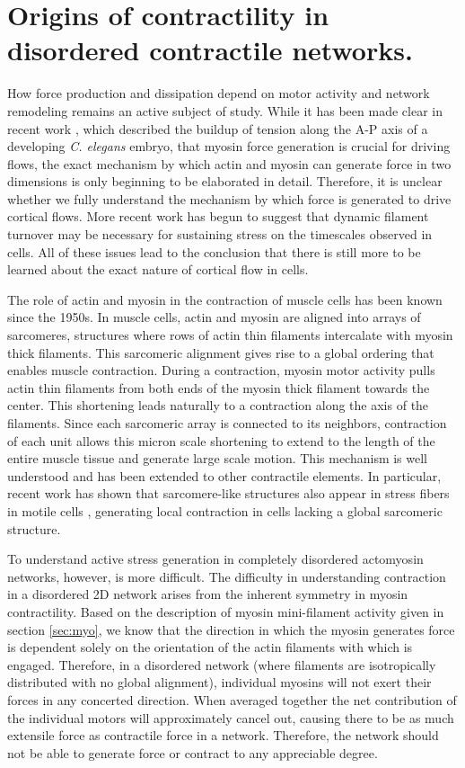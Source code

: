 \section{Origins of contractility in disordered contractile networks.}

How force production and dissipation depend on motor activity and network remodeling remains an active subject of study.  While it has been made clear in recent work \cite{cellmech_flows}, which described the buildup of tension along the A-P axis of a developing \textit{C. elegans} embryo, that myosin force generation is crucial for driving flows, the exact mechanism by which actin and myosin can generate force in two dimensions is only beginning to be elaborated in detail\cite{PhysRevX.4.041002}.  Therefore, it is unclear whether we fully understand the mechanism by which force is generated to drive cortical flows.  More recent work \cite{Mak:2016aa} has begun to suggest that dynamic filament turnover may be necessary for sustaining stress on the timescales observed in cells.  All of these issues lead to the conclusion that there is still more to be learned about the exact nature of cortical flow in cells.

The role of actin and myosin in the contraction of muscle cells has been known since the 1950s\cite{HUXLEY1954,}.  In muscle cells, actin and myosin are aligned into arrays of sarcomeres, structures where rows of actin thin filaments intercalate with myosin thick filaments\cite{Iwazumi1989}.  This sarcomeric alignment gives rise to a global ordering that enables muscle contraction. During a contraction, myosin motor activity pulls actin thin filaments from both ends of the myosin thick filament towards the center. This shortening leads naturally to a contraction along the axis of the filaments. Since each sarcomeric array is connected to its neighbors, contraction of each unit  allows this micron scale shortening to extend to the length of the entire muscle tissue and generate large scale motion.  This mechanism is well understood and has been extended to other contractile elements.  In particular, recent work has shown that sarcomere-like structures also appear in stress fibers in motile cells \cite{Kassianidou20153065}, generating local contraction in cells lacking a global sarcomeric structure. 

To understand active stress generation in completely disordered actomyosin networks, however, is more difficult. The difficulty in understanding contraction in a disordered 2D network arises from the inherent symmetry in myosin contractility.  Based on the description of myosin mini-filament activity given in section \ref{sec:myo}, we know that the direction in which the myosin generates force is dependent solely on the orientation of the actin filaments with which is engaged.  Therefore, in a disordered network (where filaments are isotropically distributed with no global alignment), individual myosins will not exert their forces in any concerted direction. When averaged together the net contribution of the individual motors will approximately cancel out, causing there to be as much extensile force as contractile force in a network.  Therefore, the network should not be able to generate force or contract to any appreciable degree.

